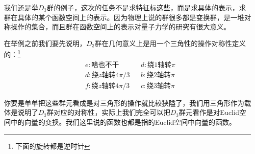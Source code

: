 \begin{figure}[h]
	\begin{floatrow}[2]
	\end{floatrow}
\end{figure}

我们还是举$D_3$群的例子，这次的任务不是求特征标这些，而是求具体的表示，求群在具体的某个函数空间上的表示。因为物理上说的群很多都是变换群，是一堆对称操作的集合，而且群在函数空间上的表示对量子力学的研究有很大意义。

在举例之前我们要先说明，$D_3$群在几何意义上是用一个三角性的操作对称性定义的：\footnote{下面的旋转都是逆时针}
\begin{align*}
	&e:\text{啥也不干}&&d:\text{绕1轴转$\pi$}\\
	&d:\text{绕$z$轴转$4\pi/3$}&&b:\text{绕2轴转$\pi$}\\
	&f:\text{绕$z$轴转$4\pi/3$}&&c:\text{绕3轴转$\pi$}
\end{align*}

你要是单单把这些群元看成是对三角形的操作就比较狭隘了，我们用三角形作为载体是说明了$D_3$群对应的对称性，实际上我们完全可以把$D_3$群元看作是对Euclid空间中的向量的变换。我们这里说的函数也都是指的Euclid空间中向量的函数。

